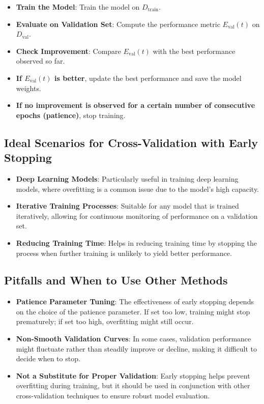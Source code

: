 \documentclass[10pt]{article}
\begin{document}
\begin{itemize}
    \item \textbf{Train the Model}: Train the model on \(D_{\text{train}}\).
    \item \textbf{Evaluate on Validation Set}: Compute the performance metric \(E_{\text{val}}(t)\) on \(D_{\text{val}}\).
    \item \textbf{Check Improvement}: Compare \(E_{\text{val}}(t)\) with the best performance observed so far.
    \item \textbf{If \(E_{\text{val}}(t)\) is better}, update the best performance and save the model weights.
    \item \textbf{If no improvement is observed for a certain number of consecutive epochs (patience)}, stop training.
\end{itemize}

\subsection{Ideal Scenarios for Cross-Validation with Early Stopping}
\begin{itemize}
    \item \textbf{Deep Learning Models}: Particularly useful in training deep learning models, where overfitting is a common issue due to the model’s high capacity.
    \item \textbf{Iterative Training Processes}: Suitable for any model that is trained iteratively, allowing for continuous monitoring of performance on a validation set.
    \item \textbf{Reducing Training Time}: Helps in reducing training time by stopping the process when further training is unlikely to yield better performance.
\end{itemize}

\subsection{Pitfalls and When to Use Other Methods}
\begin{itemize}
    \item \textbf{Patience Parameter Tuning}: The effectiveness of early stopping depends on the choice of the patience parameter. If set too low, training might stop prematurely; if set too high, overfitting might still occur.
    \item \textbf{Non-Smooth Validation Curves}: In some cases, validation performance might fluctuate rather than steadily improve or decline, making it difficult to decide when to stop.
    \item \textbf{Not a Substitute for Proper Validation}: Early stopping helps prevent overfitting during training, but it should be used in conjunction with other cross-validation techniques to ensure robust model evaluation.
\end{itemize}
\end{document}
